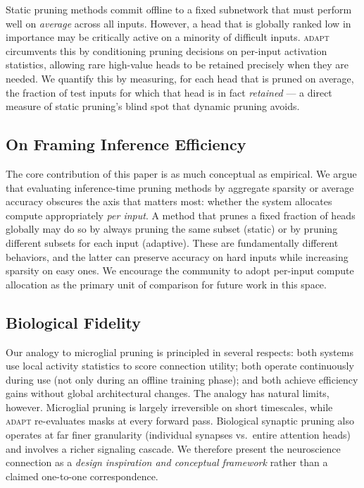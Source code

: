 \documentclass{article}
\newcommand{\system}{\textsc{adapt}}
\begin{document}
Static pruning methods commit offline to a fixed subnetwork that must perform well on
\emph{average} across all inputs. However, a head that is globally ranked low in importance
may be critically active on a minority of difficult inputs. \system{} circumvents this by
conditioning pruning decisions on per-input activation statistics, allowing rare high-value
heads to be retained precisely when they are needed. We quantify this by measuring, for each
head that is pruned on average, the fraction of test inputs for which that head is in fact
\emph{retained} --- a direct measure of static pruning's blind spot that dynamic pruning
avoids.

\subsection{On Framing Inference Efficiency}
\label{sec:disc_framing}

The core contribution of this paper is as much conceptual as empirical. We argue that
evaluating inference-time pruning methods by aggregate sparsity or average accuracy obscures
the axis that matters most: whether the system allocates compute appropriately \emph{per
input}. A method that prunes a fixed fraction of heads globally may do so by always pruning
the same subset (static) or by pruning different subsets for each input (adaptive). These are
fundamentally different behaviors, and the latter can preserve accuracy on hard inputs while
increasing sparsity on easy ones. We encourage the community to adopt per-input compute
allocation as the primary unit of comparison for future work in this space.

\subsection{Biological Fidelity}
\label{sec:disc_bio}

Our analogy to microglial pruning is principled in several respects: both systems use local
activity statistics to score connection utility; both operate continuously during use (not
only during an offline training phase); and both achieve efficiency gains without global
architectural changes. The analogy has natural limits, however. Microglial pruning is largely
irreversible on short timescales, while \system{} re-evaluates masks at every forward pass.
Biological synaptic pruning also operates at far finer granularity (individual synapses vs.\
entire attention heads) and involves a richer signaling cascade. We therefore present the
neuroscience connection as a \emph{design inspiration and conceptual framework} rather than a
claimed one-to-one correspondence.
\end{document}
